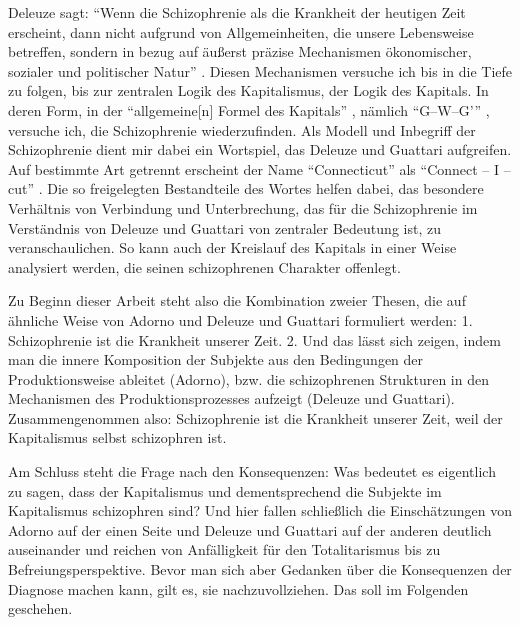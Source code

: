 \documentclass[12pt,
               paper=a4,
               twoside=false,
               onehalfspacing,
               bibliography=totoc,
               toc=graduated,
               ]{scrartcl}
\newcommand{\pc}[2]{\parencite[#1]{#2}}
\newcommand{\dg}{Deleuze und Guattari\xspace}
\begin{document}
Deleuze sagt: "`Wenn die Schizophrenie als die Krankheit der heutigen
Zeit erscheint, dann nicht aufgrund von Allgemeinheiten, die unsere
Lebensweise betreffen, sondern in bezug auf äußerst präzise
Mechanismen ökonomischer, sozialer und politischer Natur"'
\pc{28}{schizg}. Diesen Mechanismen versuche ich bis in die Tiefe zu
folgen, bis zur zentralen Logik des Kapitalismus, der Logik des
Kapitals. In deren Form, in der "`allgemeine[n] Formel des Kapitals"'
\pc{161}{kap}, nämlich "`G--W--G'"' \pc{165}{kap}, versuche ich, die
Schizophrenie wiederzufinden. Als Modell und Inbegriff der
Schizophrenie dient mir dabei ein Wortspiel, das \dg aufgreifen. Auf
bestimmte Art getrennt erscheint der Name "`Connecticut"' als
"`Connect -- I -- cut"' \pc{48}{ao}. Die so freigelegten Bestandteile
des Wortes helfen dabei, das besondere Verhältnis von Verbindung und
Unterbrechung, das für die Schizophrenie im Verständnis von \dg von
zentraler Bedeutung ist, zu veranschaulichen. So kann auch der
Kreislauf des Kapitals in einer Weise analysiert werden, die seinen
schizophrenen Charakter offenlegt.

Zu Beginn dieser Arbeit steht also die Kombination zweier Thesen, die
auf ähnliche Weise von Adorno und \dg formuliert werden: 1.
Schizophrenie ist die Krankheit unserer Zeit. 2. Und das lässt sich
zeigen, indem man die innere Komposition der Subjekte aus den
Bedingungen der Produktionsweise ableitet (Adorno), bzw. die
schizophrenen Strukturen in den Mechanismen des Produktionsprozesses
aufzeigt (\dg). Zusammengenommen also: Schizophrenie ist die Krankheit
unserer Zeit, weil der Kapitalismus selbst schizophren ist.

Am Schluss steht die Frage nach den Konsequenzen: Was bedeutet es
eigentlich zu sagen, dass der Kapitalismus und dementsprechend die
Subjekte im Kapitalismus schizophren sind? Und hier fallen schließlich
die Einschätzungen von Adorno auf der einen Seite und \dg auf der
anderen deutlich auseinander und reichen von \glq Anfälligkeit für den
Totalitarismus\grq{} bis zu \glq Befreiungsperspektive\grq{}. Bevor
man  sich aber Gedanken über die Konsequenzen der Diagnose machen
kann, gilt es, sie nachzuvollziehen. Das soll im Folgenden geschehen.



\end{document}
